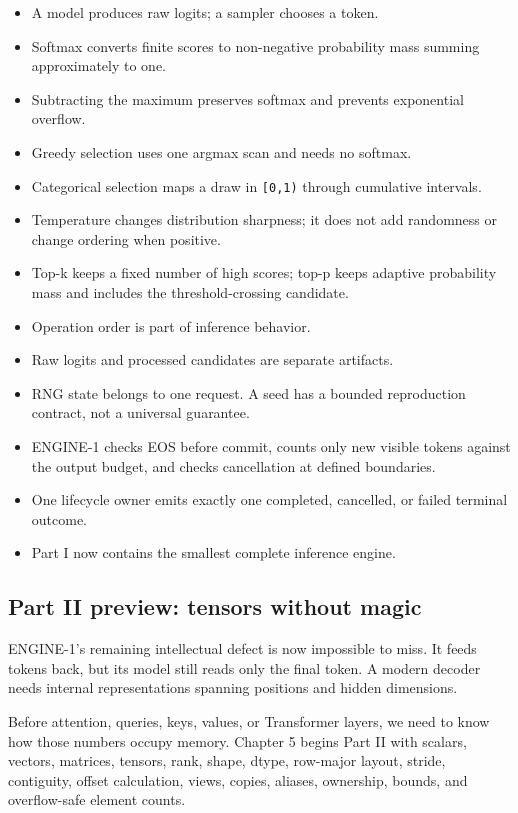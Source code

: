 \documentclass[
  10pt,
]{article}
\providecommand{\tightlist}{%
  \setlength{\itemsep}{0pt}\setlength{\parskip}{0pt}}
\begin{document}
\begin{itemize}
\tightlist
\item
  A model produces raw logits; a sampler chooses a token.
\item
  Softmax converts finite scores to non-negative probability mass
  summing approximately to one.
\item
  Subtracting the maximum preserves softmax and prevents exponential
  overflow.
\item
  Greedy selection uses one argmax scan and needs no softmax.
\item
  Categorical selection maps a draw in \texttt{{[}0,1)} through
  cumulative intervals.
\item
  Temperature changes distribution sharpness; it does not add randomness
  or change ordering when positive.
\item
  Top-k keeps a fixed number of high scores; top-p keeps adaptive
  probability mass and includes the threshold-crossing candidate.
\item
  Operation order is part of inference behavior.
\item
  Raw logits and processed candidates are separate artifacts.
\item
  RNG state belongs to one request. A seed has a bounded reproduction
  contract, not a universal guarantee.
\item
  ENGINE-1 checks EOS before commit, counts only new visible tokens
  against the output budget, and checks cancellation at defined
  boundaries.
\item
  One lifecycle owner emits exactly one completed, cancelled, or failed
  terminal outcome.
\item
  Part I now contains the smallest complete inference engine.
\end{itemize}

\subsection{Part II preview: tensors without
magic}\label{part-ii-preview-tensors-without-magic}

ENGINE-1's remaining intellectual defect is now impossible to miss. It
feeds tokens back, but its model still reads only the final token. A
modern decoder needs internal representations spanning positions and
hidden dimensions.

Before attention, queries, keys, values, or Transformer layers, we need
to know how those numbers occupy memory. Chapter 5 begins Part II with
scalars, vectors, matrices, tensors, rank, shape, dtype, row-major
layout, stride, contiguity, offset calculation, views, copies, aliases,
ownership, bounds, and overflow-safe element counts.
\end{document}
